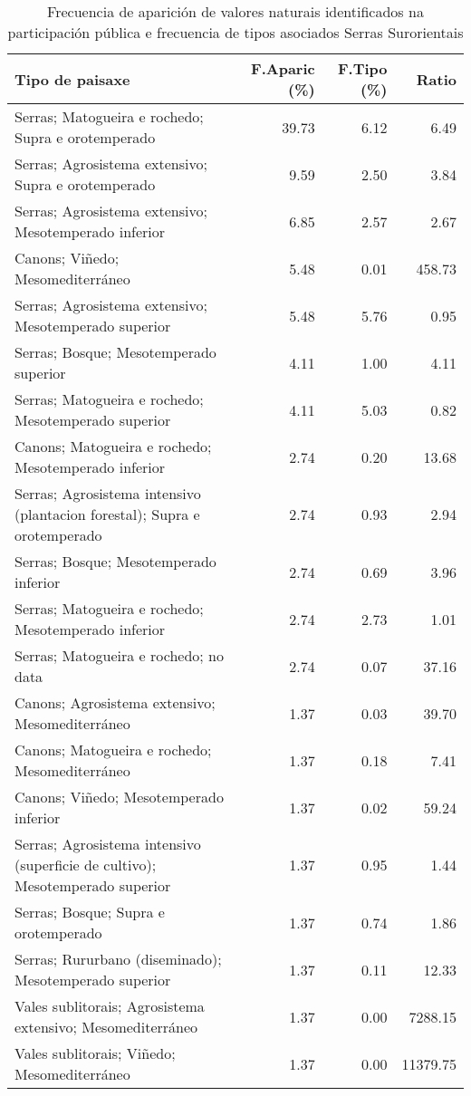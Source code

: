 \begin{table}[p]
\centering
\caption{Frecuencia de aparición de valores naturais identificados na participación pública e frecuencia de tipos asociados Serras Surorientais} 
\label{vsixotnat9}
\begin{tabular}{lrrr}
  \hline
Tipo de paisaxe & F.Aparic (\%) & F.Tipo (\%) & Ratio \\ 
  \hline
Serras; Matogueira e rochedo; Supra e orotemperado & 39.73 & 6.12 & 6.49 \\ 
  Serras; Agrosistema extensivo; Supra e orotemperado & 9.59 & 2.50 & 3.84 \\ 
  Serras; Agrosistema extensivo; Mesotemperado inferior & 6.85 & 2.57 & 2.67 \\ 
  Canons; Viñedo; Mesomediterráneo & 5.48 & 0.01 & 458.73 \\ 
  Serras; Agrosistema extensivo; Mesotemperado superior & 5.48 & 5.76 & 0.95 \\ 
  Serras; Bosque; Mesotemperado superior & 4.11 & 1.00 & 4.11 \\ 
  Serras; Matogueira e rochedo; Mesotemperado superior & 4.11 & 5.03 & 0.82 \\ 
  Canons; Matogueira e rochedo; Mesotemperado inferior & 2.74 & 0.20 & 13.68 \\ 
  Serras; Agrosistema intensivo (plantacion forestal); Supra e orotemperado & 2.74 & 0.93 & 2.94 \\ 
  Serras; Bosque; Mesotemperado inferior & 2.74 & 0.69 & 3.96 \\ 
  Serras; Matogueira e rochedo; Mesotemperado inferior & 2.74 & 2.73 & 1.01 \\ 
  Serras; Matogueira e rochedo; no data & 2.74 & 0.07 & 37.16 \\ 
  Canons; Agrosistema extensivo; Mesomediterráneo & 1.37 & 0.03 & 39.70 \\ 
  Canons; Matogueira e rochedo; Mesomediterráneo & 1.37 & 0.18 & 7.41 \\ 
  Canons; Viñedo; Mesotemperado inferior & 1.37 & 0.02 & 59.24 \\ 
  Serras; Agrosistema intensivo (superficie de cultivo); Mesotemperado superior & 1.37 & 0.95 & 1.44 \\ 
  Serras; Bosque; Supra e orotemperado & 1.37 & 0.74 & 1.86 \\ 
  Serras; Rururbano (diseminado); Mesotemperado superior & 1.37 & 0.11 & 12.33 \\ 
  Vales sublitorais; Agrosistema extensivo; Mesomediterráneo & 1.37 & 0.00 & 7288.15 \\ 
  Vales sublitorais; Viñedo; Mesomediterráneo & 1.37 & 0.00 & 11379.75 \\ 
   \hline
\end{tabular}
\end{table}
